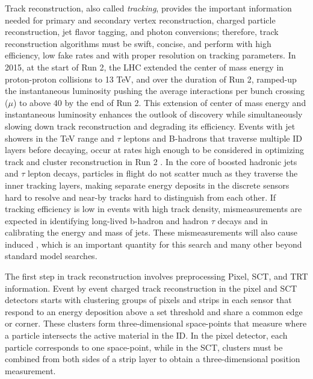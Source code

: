 Track reconstruction, also called \textit{tracking}, provides the important information needed for primary and secondary vertex reconstruction, charged particle reconstruction, jet flavor tagging, and photon conversions; therefore, track reconstruction algorithms must be swift, concise, and perform with high efficiency, low fake rates and with proper resolution on tracking parameters.  In 2015, at the start of Run 2, the LHC extended the center of mass energy in proton-proton collisions to 13 TeV, and over the duration of Run 2, ramped-up the instantaneous luminosity pushing the average interactions per bunch crossing ($\mu$) to above 40 by the end of Run 2.  This extension of center of mass energy and instantaneous luminosity enhances the outlook of discovery while simultaneously slowing down track reconstruction and degrading its efficiency.  Events with jet showers in the TeV range and $\tau$ leptons and B-hadrons that traverse multiple ID layers before decaying, occur at rates high enough to be considered in optimizing track and cluster reconstruction in Run 2 \cite{aad}.  In the core of boosted hadronic jets and $\tau$ lepton decays, particles in flight do not scatter much as they traverse the inner tracking layers, making separate energy deposits in the discrete sensors hard to resolve and near-by tracks hard to distinguish from each other.  If tracking efficiency is low in events with high track density, mismeasurements are expected in identifying long-lived b-hadron and hadron $\tau$ decays and in calibrating the energy and mass of jets.  These mismeasurements will also cause induced \met, which is an important quantity for this search and many other beyond standard model searches.  

The first step in track reconstruction involves preprocessing Pixel, SCT, and TRT information. Event by event charged track reconstruction in the pixel and SCT detectors starts with clustering groups of pixels and strips in each sensor that respond to an energy deposition above a set threshold and share a common edge or corner.  These clusters form three-dimensional space-points that measure where a particle intersects the active material in the ID.  In the pixel detector, each particle corresponds to one space-point, while in the SCT, clusters must be combined from both sides of a strip layer to obtain a three-dimensional position measurement.  %


